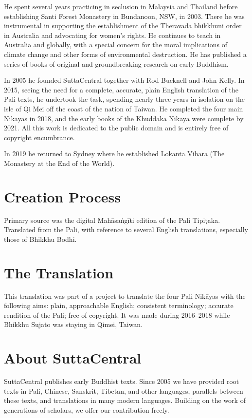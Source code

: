 \documentclass[12pt,openany]{book}%
\begin{document}
He spent several years practicing in seclusion in Malaysia and Thailand before establishing Santi Forest Monastery in Bundanoon, NSW, in 2003. There he was instrumental in supporting the establishment of the Theravada bhikkhuni order in Australia and advocating for women’s rights. He continues to teach in Australia and globally, with a special concern for the moral implications of climate change and other forms of environmental destruction. He has published a series of books of original and groundbreaking research on early Buddhism. 

In 2005 he founded SuttaCentral together with Rod Bucknell and John Kelly. In 2015, seeing the need for a complete, accurate, plain English translation of the Pali texts, he undertook the task, spending nearly three years in isolation on the isle of Qi Mei off the coast of the nation of Taiwan. He completed the four main \textsanskrit{Nikāyas} in 2018, and the early books of the Khuddaka \textsanskrit{Nikāya} were complete by 2021. All this work is dedicated to the public domain and is entirely free of copyright encumbrance. 

In 2019 he returned to Sydney where he established Lokanta Vihara (The Monastery at the End of the World). 

\section*{Creation Process}

Primary source was the digital \textsanskrit{Mahāsaṅgīti} edition of the Pali \textsanskrit{Tipiṭaka}. Translated from the Pali, with reference to several English translations, especially those of Bhikkhu Bodhi.

\section*{The Translation}

This translation was part of a project to translate the four Pali \textsanskrit{Nikāyas} with the following aims: plain, approachable English; consistent terminology; accurate rendition of the Pali; free of copyright. It was made during 2016–2018 while Bhikkhu Sujato was staying in Qimei, Taiwan.

\section*{About SuttaCentral}

SuttaCentral publishes early Buddhist texts. Since 2005 we have provided root texts in Pali, Chinese, Sanskrit, Tibetan, and other languages, parallels between these texts, and translations in many modern languages. Building on the work of generations of scholars, we offer our contribution freely.
\end{document}
